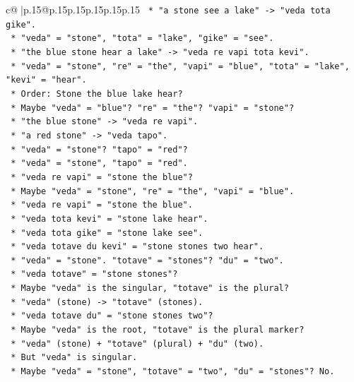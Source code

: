 \documentclass{article}
\begin{document}
{\begin{supertabular}{c@{$\;$}|p{.15\linewidth}@{}p{.15\linewidth}p{.15\linewidth}p{.15\linewidth}p{.15\linewidth}p{.15\linewidth}}
{{{\texttt{    *   "a stone see a lake" {-}> "veda tota gike".} \\
\texttt{    *   "veda" = "stone", "tota" = "lake", "gike" = "see".} \\
\texttt{    *   "the blue stone hear a lake" {-}> "veda re vapi tota kevi".} \\
\texttt{    *   "veda" = "stone", "re" = "the", "vapi" = "blue", "tota" = "lake", "kevi" = "hear".} \\
\texttt{    *   Order: Stone the blue lake hear?} \\
\texttt{    *   Maybe "veda" = "blue"? "re" = "the"? "vapi" = "stone"?} \\
\texttt{    *   "the blue stone" {-}> "veda re vapi".} \\
\texttt{    *   "a red stone" {-}> "veda tapo".} \\
\texttt{    *   "veda" = "stone"? "tapo" = "red"?} \\
\texttt{    *   "veda" = "stone", "tapo" = "red".} \\
\texttt{    *   "veda re vapi" = "stone the blue"?} \\
\texttt{    *   Maybe "veda" = "stone", "re" = "the", "vapi" = "blue".} \\
\texttt{    *   "veda re vapi" = "stone the blue".} \\
\texttt{    *   "veda tota kevi" = "stone lake hear".} \\
\texttt{    *   "veda tota gike" = "stone lake see".} \\
\texttt{    *   "veda totave du kevi" = "stone stones two hear".} \\
\texttt{    *   "veda" = "stone". "totave" = "stones"? "du" = "two".} \\
\texttt{    *   "veda totave" = "stone stones"?} \\
\texttt{    *   Maybe "veda" is the singular, "totave" is the plural?} \\
\texttt{    *   "veda" (stone) {-}> "totave" (stones).} \\
\texttt{    *   "veda totave du" = "stone stones two"?} \\
\texttt{    *   Maybe "veda" is the root, "totave" is the plural marker?} \\
\texttt{    *   "veda" (stone) + "totave" (plural) + "du" (two).} \\
\texttt{    *   But "veda" is singular.} \\
\texttt{    *   Maybe "veda" = "stone", "totave" = "two", "du" = "stones"? No.} \\
}}}
\end{supertabular}}
\end{document}
